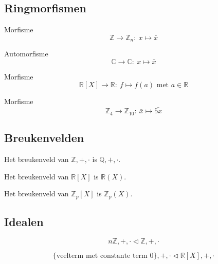 \documentclass[main.tex]{subfiles}
\begin{document}
\subsection{Ringmorfismen}
\label{sec:ringmorfismen}

\begin{vb}
  Morfisme
  \[ \mathbb{Z} \rightarrow \mathbb{Z}_{n}:\ x \mapsto \bar{x} \]
\end{vb}

\begin{vb}
  Automorfisme
  \[ \mathbb{C} \rightarrow \mathbb{C}:\ x \mapsto \bar{x} \]
\end{vb}

\begin{vb}
  Morfisme
  \[ \mathbb{R}[X] \rightarrow \mathbb{R}:\ f \mapsto f(a) \text{ met } a \in \mathbb{R} \]
\end{vb}

\begin{vb}
  Morfisme
  \[ \mathbb{Z}_{4} \rightarrow \mathbb{Z}_{10}:\ \bar{x} \mapsto \bar{5x} \]
\end{vb}


\subsection{Breukenvelden}
\label{sec:breukenvelden}

\begin{vb}
  Het breukenveld van $\mathbb{Z},+,\cdot$ is $\mathbb{Q},+,\cdot$.
\end{vb}

\begin{vb}
  Het breukenveld van $\mathbb{R}[X]$ is $\mathbb{R}(X)$.
\end{vb}

\begin{vb}
  Het breukenveld van $\mathbb{Z}_{p}[X]$ is $\mathbb{Z}_{p}(X)$.
\end{vb}

\subsection{Idealen}
\label{sec:idealen}

\begin{vb}
  \[ n\mathbb{Z},+,\cdot \triangleleft \mathbb{Z},+,\cdot \]
\end{vb}

\begin{vb}
  \[ \{\text{veelterm met constante term } 0 \},+,\cdot \triangleleft \mathbb{R}[X],+,\cdot \]
\end{vb}
\end{document}
